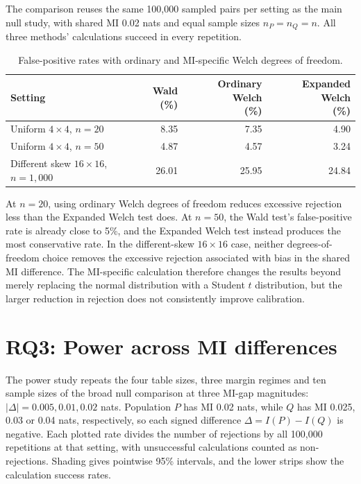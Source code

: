 The comparison reuses the same 100,000 sampled pairs per setting as the
main null study, with shared MI 0.02 nats and equal sample sizes
\(n_P=n_Q=n\). All three methods' calculations succeed in every repetition.

\begin{table}[H]
\centering
\caption{False-positive rates with ordinary and MI-specific Welch degrees of freedom.}
\label{tab:ordinary-welch-comparison}
\thesistableformat
\begin{tabularx}{\textwidth}{@{}>{\raggedright\arraybackslash}Xrrr@{}}
\toprule
Setting & \shortstack{Wald\\(\%)} & \shortstack{Ordinary Welch\\(\%)} & \shortstack{Expanded Welch\\(\%)}\\
\midrule
Uniform \(4\times4\), \(n=20\) & 8.35 & 7.35 & 4.90\\
Uniform \(4\times4\), \(n=50\) & 4.87 & 4.57 & 3.24\\
Different skew \(16\times16\), \(n=1{,}000\) & 26.01 & 25.95 & 24.84\\
\bottomrule
\end{tabularx}
\end{table}

At \(n=20\), using ordinary Welch degrees of freedom reduces excessive
rejection less than the Expanded Welch test does. At \(n=50\), the Wald
test's false-positive rate is already close to 5\%, and the Expanded Welch
test instead produces the most conservative rate. In the different-skew
\(16\times16\) case, neither degrees-of-freedom choice removes the excessive rejection
associated with bias in the shared MI difference. The MI-specific
calculation therefore changes the results beyond merely replacing the
normal distribution with a Student \(t\) distribution, but the larger
reduction in rejection does not consistently improve calibration.

\section{RQ3: Power across MI differences}
\label{sec:mi-gap-power-results}

The power study repeats the four table sizes, three margin regimes and
ten sample sizes of the broad null comparison at three MI-gap magnitudes:
\(|\Delta|=0.005,0.01,0.02\) nats. Population \(P\) has MI 0.02 nats,
while \(Q\) has MI 0.025, 0.03 or 0.04 nats, respectively, so each
signed difference \(\Delta=I(P)-I(Q)\) is negative. Each plotted rate
divides the number of rejections by all 100,000 repetitions at that setting,
with unsuccessful calculations counted as non-rejections. Shading gives
pointwise 95\% intervals, and the lower strips show the calculation success rates.

